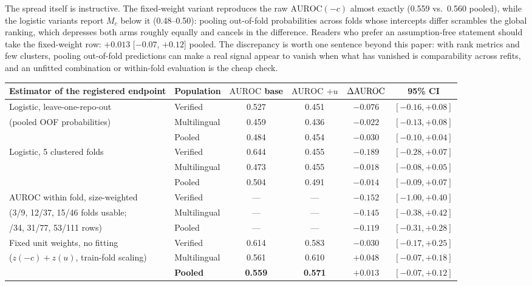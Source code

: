 \documentclass[11pt]{article}
\begin{document}
The spread itself is instructive. The fixed-weight variant reproduces the raw $\mathrm{AUROC}(-c)$ almost exactly (0.559 vs.\ 0.560 pooled), while the logistic variants report $M_c$ below it (0.48--0.50): pooling out-of-fold probabilities across folds whose intercepts differ scrambles the global ranking, which depresses both arms roughly equally and cancels in the difference. Readers who prefer an assumption-free statement should take the fixed-weight row: $+0.013$ [$-0.07$, $+0.12$] pooled. The discrepancy is worth one sentence beyond this paper: with rank metrics and few clusters, pooling out-of-fold predictions can make a real signal appear to vanish when what has vanished is comparability across refits, and an unfitted combination or within-fold evaluation is the cheap check.
\begin{table}[t]\centering\footnotesize
\begin{tabular}{llcccc}\toprule
Estimator of the registered endpoint & Population & $\mathrm{AUROC}$ base & $\mathrm{AUROC}$ $+u$ & $\Delta\mathrm{AUROC}$ & 95\% CI \\\midrule
Logistic, leave-one-repo-out & Verified & 0.527 & 0.451 & $-0.076$ & $[-0.16, +0.08]$ \\
(pooled OOF probabilities) & Multilingual & 0.459 & 0.436 & $-0.022$ & $[-0.13, +0.08]$ \\
 & Pooled & 0.484 & 0.454 & $-0.030$ & $[-0.10, +0.04]$ \\\midrule
Logistic, 5 clustered folds & Verified & 0.644 & 0.455 & $-0.189$ & $[-0.28, +0.07]$ \\
 & Multilingual & 0.473 & 0.455 & $-0.018$ & $[-0.08, +0.05]$ \\
 & Pooled & 0.504 & 0.491 & $-0.014$ & $[-0.09, +0.07]$ \\\midrule
AUROC within fold, size-weighted & Verified & --- & --- & $-0.152$ & $[-1.00, +0.40]$ \\
(3/9, 12/37, 15/46 folds usable; & Multilingual & --- & --- & $-0.145$ & $[-0.38, +0.42]$ \\
\;22/34, 31/77, 53/111 rows) & Pooled & --- & --- & $-0.119$ & $[-0.31, +0.28]$ \\\midrule
Fixed unit weights, no fitting & Verified & 0.614 & 0.583 & $-0.030$ & $[-0.17, +0.25]$ \\
($z(-c)+z(u)$, train-fold scaling) & Multilingual & 0.561 & 0.610 & $+0.048$ & $[-0.07, +0.18]$ \\
 & \textbf{Pooled} & \textbf{0.559} & \textbf{0.571} & $\mathbf{+0.013}$ & $\mathbf{[-0.07, +0.12]}$ \\\bottomrule

\end{tabular}
\end{table}
\end{document}
